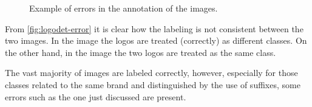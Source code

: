 \begin{figure}%
	\centering
	\hfill
	\caption{Example of errors in the annotation of the images.}
	\label{fig:logodet-error}%
\end{figure}

From \autoref{fig:logodet-error} it is clear how the labeling is not consistent between the two images. In the image  the logos are treated (correctly) as different classes. On the other hand, in the image  the two logos are treated as the same class.

The vast majority of images are labeled correctly, however, especially for those classes related to the same brand and distinguished by the use of suffixes, some errors such as the one just discussed are present.